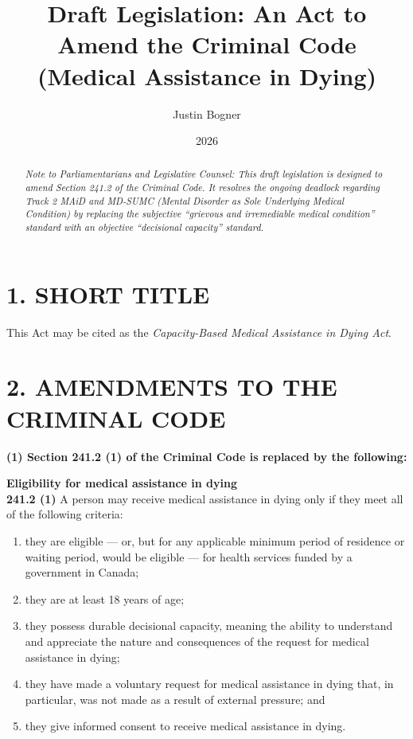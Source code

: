 \documentclass[11pt]{article}
\title{Draft Legislation: An Act to Amend the Criminal Code (Medical Assistance in Dying)}
\author{Justin Bogner}
\date{2026}
\begin{document}
\maketitle

\begin{abstract}
\noindent \textit{Note to Parliamentarians and Legislative Counsel: This draft legislation is designed to amend Section 241.2 of the Criminal Code. It resolves the ongoing deadlock regarding Track 2 MAiD and MD-SUMC (Mental Disorder as Sole Underlying Medical Condition) by replacing the subjective ``grievous and irremediable medical condition'' standard with an objective ``decisional capacity'' standard.}
\end{abstract}

\section*{1. SHORT TITLE}
This Act may be cited as the \textit{Capacity-Based Medical Assistance in Dying Act}.

\section*{2. AMENDMENTS TO THE CRIMINAL CODE}

\textbf{(1) Section 241.2 (1) of the Criminal Code is replaced by the following:}

\vspace{0.5em}
\noindent \textbf{Eligibility for medical assistance in dying} \\
\textbf{241.2 (1)} A person may receive medical assistance in dying only if they meet all of the following criteria:
\begin{enumerate}
    \item[(a)] they are eligible --- or, but for any applicable minimum period of residence or waiting period, would be eligible --- for health services funded by a government in Canada;
    \item[(b)] they are at least 18 years of age;
    \item[(c)] they possess durable decisional capacity, meaning the ability to understand and appreciate the nature and consequences of the request for medical assistance in dying;
    \item[(d)] they have made a voluntary request for medical assistance in dying that, in particular, was not made as a result of external pressure; and
    \item[(e)] they give informed consent to receive medical assistance in dying.
\end{enumerate}
\end{document}
